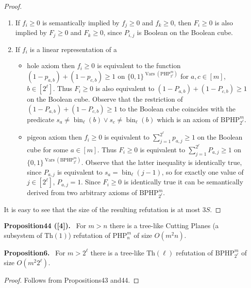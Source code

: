 \documentclass[10pt,a4paper]{article}
\newenvironment{authorclaim}[1]{\par\medskip\noindent\textbf{#1.}\ \ignorespaces}{\par\medskip}
\begin{document}
\begin{proof}
\begin{enumerate}
\item[(a)] If $f_i\ge0$ is semantically implied by $f_j\ge0$ and $f_k\ge0$, then $F_i\ge0$ is also implied by $F_j\ge0$ and $F_k\ge0$, since $P_{i,j}$ is Boolean on the Boolean cube.
\item[(b)] If $f_i$ is a linear representation of a
\begin{itemize}
\item hole axiom then $f_i\ge0$ is equivalent to the function $(1-p_{a,b})+(1-p_{c,b})\ge1$ on $\{0,1\}^{\operatorname{Vars}(\mathrm{PHP}_{2^\ell}^m)}$ for $a,c\in[m]$, $b\in[2^\ell]$. Thus $F_i\ge0$ is also equivalent to $(1-P_{a,b})+(1-P_{c,b})\ge1$ on the Boolean cube. Observe that the restriction of $(1-P_{a,b})+(1-P_{c,b})\ge1$ to the Boolean cube coincides with the predicate $s_a\ne\operatorname{bin}_\ell(b)\vee s_c\ne\operatorname{bin}_\ell(b)$ which is an axiom of $\mathrm{BPHP}_{2^\ell}^m$.
\item pigeon axiom then $f_i\ge0$ is equivalent to $\sum_{j=1}^{2^\ell}p_{a,j}\ge1$ on the Boolean cube for some $a\in[m]$. Thus $F_i\ge0$ is equivalent to $\sum_{j=1}^{2^\ell}P_{a,j}\ge1$ on $\{0,1\}^{\operatorname{Vars}(\mathrm{BPHP}_{2^\ell}^m)}$. Observe that the latter inequality is identically true, since $P_{a,j}$ is equivalent to $s_a=\operatorname{bin}_\ell(j-1)$, so for exactly one value of $j\in[2^\ell]$, $P_{a,j}=1$. Since $F_i\ge0$ is identically true it can be semantically derived from two arbitrary axioms of $\mathrm{BPHP}_{2^\ell}^m$.
\end{itemize}
\end{enumerate}
It is easy to see that the size of the resulting refutation is at most $3S$.
\end{proof}
\begin{authorclaim}{Proposition44 ([4])}
For $m>n$ there is a tree-like Cutting Planes (a subsystem of $\mathrm{Th}(1)$) refutation of $\mathrm{PHP}_n^m$ of size $O(m^2n)$.
\end{authorclaim}
\begin{authorclaim}{Proposition6}
For $m>2^\ell$ there is a tree-like $\mathrm{Th}(\ell)$ refutation of $\mathrm{BPHP}_{2^\ell}^m$ of size $O(m^2 2^\ell)$.
\end{authorclaim}
\begin{proof}
Follows from Propositions43 and44.
\end{proof}
\end{document}
